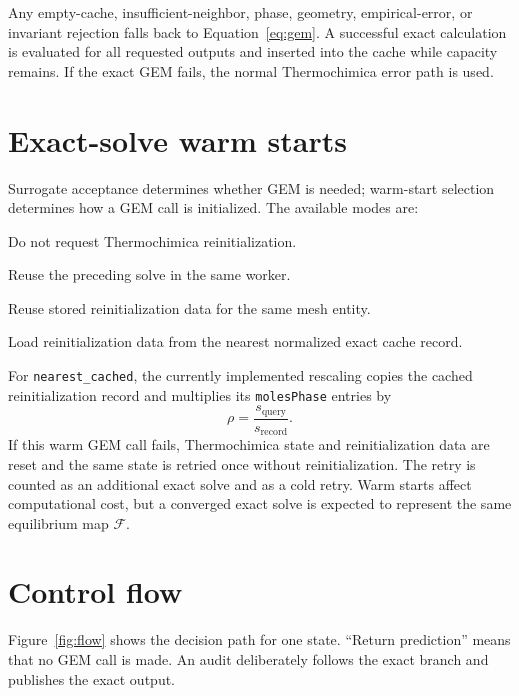\documentclass[11pt]{article}
\newcommand{\code}[1]{\texttt{#1}}
\begin{document}
Any empty-cache, insufficient-neighbor, phase, geometry, empirical-error, or invariant rejection
falls back to Equation~\eqref{eq:gem}.  A successful exact calculation is evaluated for all
requested outputs and inserted into the cache while capacity remains.  If the exact GEM fails, the
normal Thermochimica error path is used.

\section{Exact-solve warm starts}

Surrogate acceptance determines whether GEM is needed; warm-start selection determines how a GEM
call is initialized.  The available modes are:
\begin{description}[style=nextline]
  \item[\code{none}] Do not request Thermochimica reinitialization.
  \item[\code{previous\_solve}] Reuse the preceding solve in the same worker.
  \item[\code{previous\_timestep}] Reuse stored reinitialization data for the same mesh entity.
  \item[\code{nearest\_cached}] Load reinitialization data from the nearest normalized exact cache
  record.
\end{description}

For \code{nearest\_cached}, the currently implemented rescaling copies the cached reinitialization
record and multiplies its \code{molesPhase} entries by
\begin{equation}
  \rho=\frac{s_{\mathrm{query}}}{s_{\mathrm{record}}}.
  \label{eq:warm-rescale}
\end{equation}
If this warm GEM call fails, Thermochimica state and reinitialization data are reset and the same
state is retried once without reinitialization.  The retry is counted as an additional exact solve
and as a cold retry.  Warm starts affect computational cost, but a converged exact solve is expected
to represent the same equilibrium map $\mathcal{F}$.

\section{Control flow}

Figure~\ref{fig:flow} shows the decision path for one state.  ``Return prediction'' means that no
GEM call is made.  An audit deliberately follows the exact branch and publishes the exact output.
\end{document}
